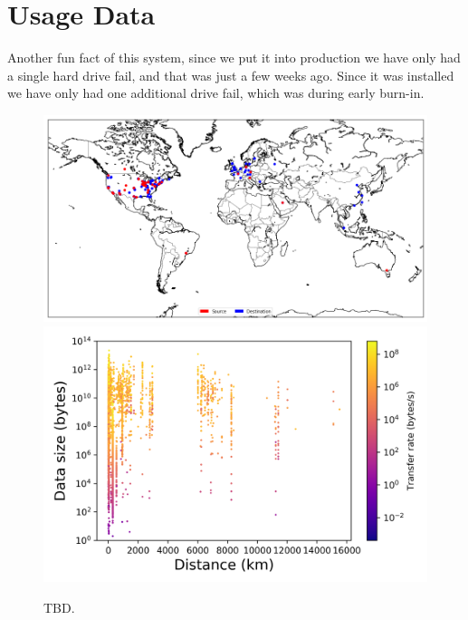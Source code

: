 \documentclass[sigconf]{acmart}
\begin{document}
\section{Usage Data}

Another fun fact of this system, since we put it into production we have only had a single hard drive fail, and that was just a few weeks ago. Since it was installed we have only had one additional drive fail, which was during early burn-in.

\begin{figure}
\centering
\includegraphics[trim=0in 0in 0in 0in,clip,width=\columnwidth]{Figures/petrel-src-dst-map.png}
\includegraphics[trim=0.1in 0.1in 0.1in 0.1in,clip,width=\columnwidth]{Figures/size-distance-speed.png}

\vspace{1ex}

\caption{TBD.\label{fig:usage}}
\end{figure}
\end{document}

